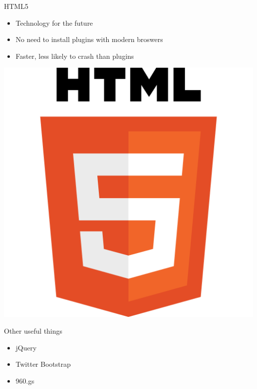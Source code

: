 \documentclass{beamer}
\begin{document}
\begin{frame}{HTML5}
  \begin{itemize}
    \item Technology for the future
    \vspace{\baselineskip}
    \item No need to install plugins with modern broswers
    \vspace{\baselineskip}
    \item Faster, less likely to crash than plugins
  \end{itemize}
  \vspace{\baselineskip}
  \begin{center}
    \includegraphics[scale=0.1]{HTML5_Logo_512.png}
  \end{center}
\end{frame}

\begin{frame}{Other useful things}
  \begin{itemize}
    \item jQuery
    \item Twitter Bootstrap
    \item 960.gs
  \end{itemize}
\end{frame}
\end{document}
